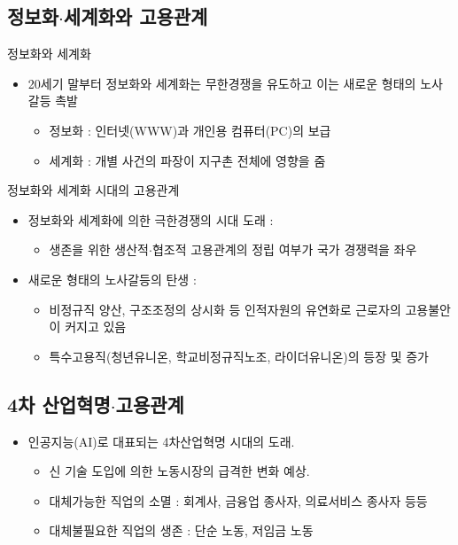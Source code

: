 \documentclass[aspectratio=169,xcolor=dvipsnames,handout]{beamer}
\begin{document}
\subsection{정보화$\cdot$세계화와 고용관계}

\begin{frame}{정보화와 세계화}
    \begin{itemize}
        \item 20세기 말부터 정보화와 세계화는 무한경쟁을 유도하고 이는 새로운 형태의 노사갈등 촉발
        \begin{itemize}
            \item 정보화 : 인터넷(WWW)과 개인용 컴퓨터(PC)의 보급
            \item 세계화 : 개별 사건의 파장이 지구촌 전체에 영향을 줌
        \end{itemize}
    \end{itemize}
\end{frame}

\begin{frame}{정보화와 세계화 시대의 고용관계}
    \begin{itemize}
        \item 정보화와 세계화에 의한 극한경쟁의 시대 도래 :
        \begin{itemize}
            \item 생존을 위한 생산적$\cdot$협조적 고용관계의 정립 여부가 국가 경쟁력을 좌우
        \end{itemize}
        \item 새로운 형태의 노사갈등의 탄생 :
        \begin{itemize}
            \item 비정규직 양산, 구조조정의 상시화 등 인적자원의 유연화로 근로자의 고용불안이 커지고 있음
            \item 특수고용직(청년유니온, 학교비정규직노조, 라이더유니온)의 등장 및 증가
        \end{itemize}
    \end{itemize}
\end{frame}

\subsection{4차 산업혁명$\cdot$고용관계}

\begin{frame}{}
    \begin{itemize}
        \item 인공지능(AI)로 대표되는 4차산업혁명 시대의 도래.
        \begin{itemize}
            \item 신 기술 도입에 의한 노동시장의 급격한 변화 예상.
            \item 대체가능한 직업의 소멸 : 회계사, 금융업 종사자, 의료서비스 종사자 등등
            \item 대체불필요한 직업의 생존 : 단순 노동, 저임금 노동
        \end{itemize}
    \end{itemize}
\end{frame}
\end{document}
